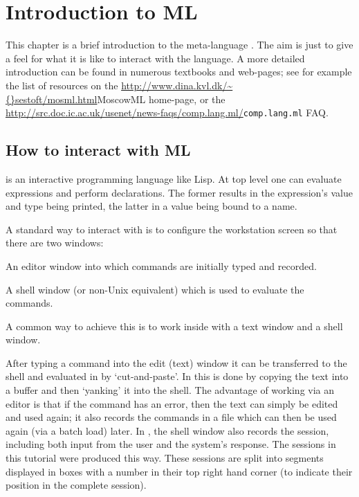 \chapter{Introduction to ML}
\label{ML}

This chapter is a brief introduction to the meta-language \ML.  The
aim is just to give a feel for what it is like to interact with the
language.  A more detailed introduction can be found in numerous
textbooks and web-pages; see for example the list of resources on the
\url{http://www.dina.kvl.dk/\~{}sestoft/mosml.html}{MoscowML home-page},
or the
\url{http://src.doc.ic.ac.uk/usenet/news-faqs/comp.lang.ml/}{\texttt{comp.lang.ml} FAQ}.

\section{How to interact with ML}

\ML{} is an interactive programming language like Lisp. At top level
one can evaluate expressions and perform declarations. The former
results in the expression's value and type being printed, the latter
in a value being bound to a name.

A standard way to interact with \ML{} is to configure the workstation
screen so that there are two windows:
\begin{myenumerate}
\item An editor window into which \ML{} commands are initially typed
  and recorded.
\item A shell window (or non-Unix equivalent) which is used to
  evaluate the commands.
\end{myenumerate}

\noindent
A common way to achieve this is to work inside  with a text
window and a shell window.

After typing a command into the edit (text) window it can be
transferred to the shell and evaluated in \HOL{} by `cut-and-paste'. In
 this is done by copying the text into a buffer and then
`yanking' it into the shell. The advantage of working via an editor is
that if the command has an error, then the text can simply be edited
and used again; it also records the commands in a file which can then
be used again (via a batch load) later. In , the shell
window also records the session, including both input from the user
and the system's response. The sessions in this tutorial were produced
this way. These sessions are split into segments displayed in boxes
with a number in their top right hand corner (to indicate their
position in the complete session).

